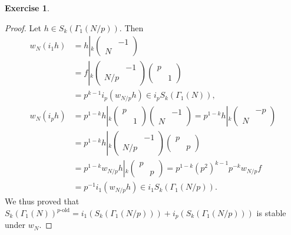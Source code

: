 \documentclass{article}
\theoremstyle{definition}
\newtheorem{example}{Exercise}
\theoremstyle{remark}
\newcommand{\old}{\mathrm{old}}
\begin{document}
\begin{example}
\begin{enumerate}
\begin{proof}
    Let $h\in S_k(\Gamma_1(N/p))$.
    Then \begin{align*}
        w_N(i_1h) &= h\left|_k\begin{pmatrix}
            &-1\\ N&
        \end{pmatrix}\right.\\ &
        = f\left|_k\begin{pmatrix}
            &-1\\ N/p&
        \end{pmatrix}\begin{pmatrix}
            p & \\ &1
        \end{pmatrix}\right.\\ &
        = p^{k-1}i_p(w_{N/p}h)\in i_pS_k(\Gamma_1(N)),\\
        w_N(i_ph) &= p^{1-k}h\left|_k\begin{pmatrix}
            p & \\ &1
        \end{pmatrix}\begin{pmatrix}
            &-1\\ N&
        \end{pmatrix}\right.
        = p^{1-k}h\left|_k\begin{pmatrix}
            &-p\\ N&
        \end{pmatrix}\right.\\ &
        = p^{1-k}h\left|_k\begin{pmatrix}
            & -1\\N/p &
        \end{pmatrix}\begin{pmatrix}
            p&\\ &p
        \end{pmatrix}\right.\\ &
        = p^{1-k}w_{N/p}h\left|_k\begin{pmatrix}
            p & \\ &p
        \end{pmatrix}\right.
        = p^{1-k}(p^2)^{k-1}p^{-k} w_{N/p}f \\ &
        = p^{-1}i_1(w_{N/p}h)\in i_1S_k(\Gamma_1(N/p)).
    \end{align*}
    We thus proved that $S_k(\Gamma_1(N))^{p\text{-}\old} = i_1(S_k(\Gamma_1(N/p))) + i_p(S_k(\Gamma_1(N/p)))$ is stable under $w_N$.

\end{proof}
\end{enumerate}
\end{example}
\end{document}
